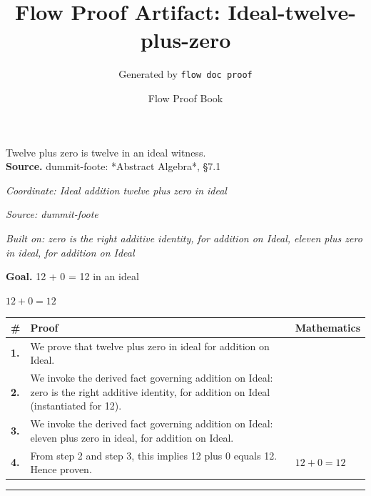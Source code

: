 \documentclass[11pt]{article}
\title{Flow Proof Artifact: Ideal-twelve-plus-zero}
\author{Generated by \texttt{flow doc proof}}
\date{Flow Proof Book}
\theoremstyle{definition}
\begin{document}
\maketitle
Twelve plus zero is twelve in an ideal witness.\\[0.5em]
\textbf{Source.} dummit-foote: *Abstract Algebra*, §7.1\\[0.5em]
\bigskip
{}\par
\smallskip\noindent\textit{Coordinate: Ideal \cdot addition \cdot twelve plus zero in ideal}\par
\smallskip\noindent\textit{Source: dummit-foote}\par
\smallskip\noindent\textit{Built on: zero is the right additive identity, for addition on Ideal, eleven plus zero in ideal, for addition on Ideal}\par
\medskip
\noindent\textbf{Goal.} 12 + 0 = 12 in an ideal\par
\noindent$\displaystyle 12 + 0 = 12$\par
\medskip
\noindent
\begin{tabular}{@{} >{\raggedright\arraybackslash}p{} >{\raggedright\arraybackslash}p{} >{\raggedleft\arraybackslash}p{} @{}}
\textbf{\#} & \textbf{Proof} & \textbf{Mathematics} \\
\midrule
\textbf{1.} & We prove that twelve plus zero in ideal for addition on Ideal. & \\[0.45em]
\textbf{2.} & We invoke the derived fact governing addition on Ideal: zero is the right additive identity, for addition on Ideal (instantiated for 12). & \\[0.45em]
\textbf{3.} & We invoke the derived fact governing addition on Ideal: eleven plus zero in ideal, for addition on Ideal. & \\[0.45em]
\textbf{4.} & From step 2 and step 3, this implies 12 plus 0 equals 12. Hence proven. & $\displaystyle 12 + 0 = 12$ \\[0.45em]
\bottomrule
\end{tabular}
\label{thm:Ideal-addition-twelve_plus_zero_in_ideal}
\par\medskip\hrule
\end{document}
